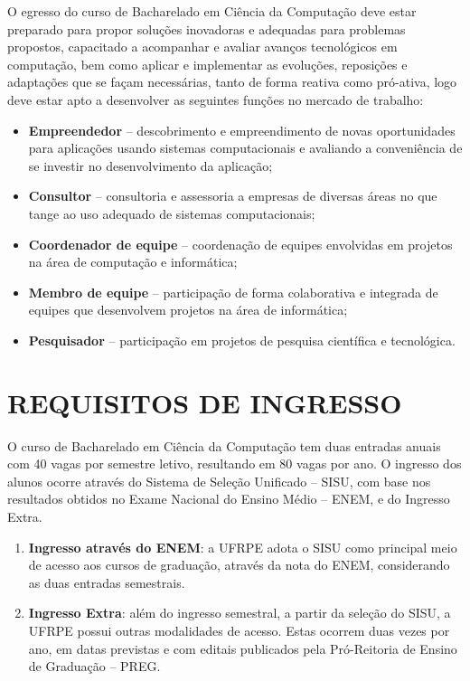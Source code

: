 \documentclass[
	12pt,				%
	openright,			%
  oneside,     %
	a4paper,			%
	chapter=TITLE,		%
	english,			%
	french,				%
	spanish,			%
	brazil				%
	]{abntex2}
\begin{document}
O egresso do curso de Bacharelado em Ciência da Computação deve estar preparado para propor soluções inovadoras e adequadas para problemas propostos, capacitado a acompanhar e avaliar avanços tecnológicos em computação, bem como aplicar e implementar as evoluções, reposições e adaptações que se façam necessárias, tanto de forma reativa como pró-ativa, logo deve estar apto a desenvolver as seguintes funções no mercado de trabalho:

\begin{itemize}
    \item \textbf{Empreendedor} – descobrimento e empreendimento de novas oportunidades para aplicações usando sistemas computacionais e avaliando a conveniência de se investir no desenvolvimento da aplicação;
    \item \textbf{Consultor} – consultoria e assessoria a empresas de diversas áreas no que tange ao uso adequado de sistemas computacionais;
    \item \textbf{Coordenador de equipe} – coordenação de equipes envolvidas em projetos na área de computação e informática;
    \item \textbf{Membro de equipe} – participação de forma colaborativa e integrada de equipes que desenvolvem projetos na área de informática;
    \item \textbf{Pesquisador} – participação em projetos de pesquisa científica e tecnológica. 
\end{itemize}




%
%


\chapter{REQUISITOS DE INGRESSO}

O curso de Bacharelado em Ciência da Computação tem duas entradas anuais com 40 vagas por semestre letivo, resultando em 80 vagas por ano. O ingresso dos alunos ocorre através do Sistema de Seleção Unificado – SISU, com base nos resultados obtidos no Exame Nacional do Ensino Médio – ENEM, e do Ingresso Extra.

\begin{enumerate}
    \item \textbf{Ingresso através do ENEM}: a UFRPE adota o SISU como principal meio de acesso aos cursos de graduação, através da nota do ENEM, considerando as duas entradas semestrais.
    \item \textbf{Ingresso Extra}: além do ingresso semestral, a partir da seleção do SISU, a UFRPE possui outras modalidades de acesso. Estas ocorrem duas vezes por ano, em datas previstas e com editais publicados pela Pró-Reitoria de Ensino de Graduação – PREG. 
\end{enumerate}
\end{document}
